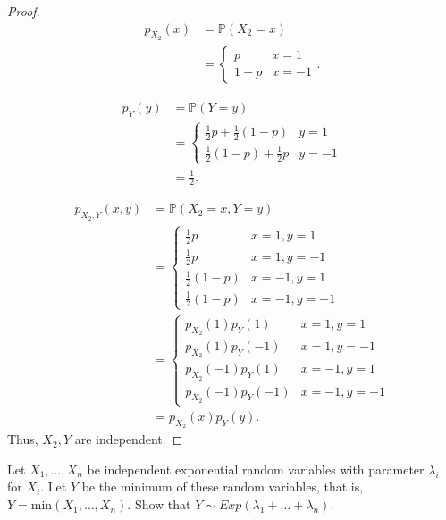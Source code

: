 \documentclass[addpoints, 11pt]{exam}
\newcommand*{\prob}{\mathds{P}}
\newenvironment{question}[1]{\smallskip\noindent\color{crimson}{\bf Question #1.}}{}
\begin{document}
\begin{proof}
    \begin{align}
        p_{X_2}(x) 
        &= \prob(X_2 = x) \\
        &= \begin{cases}
            p & x = 1 \\
            1 - p & x = -1
        \end{cases}.
    \end{align}

    \begin{align}
        p_{Y}(y) 
        &= \prob(Y = y) \\
        &= \begin{cases}
            \frac{1}{2}p + \frac{1}{2}(1 - p) & y = 1 \\
            \frac{1}{2}(1 - p) + \frac{1}{2}p & y = -1
        \end{cases} \\
        &= \frac{1}{2}.
    \end{align}

    \begin{align}
        p_{X_2, Y}(x, y)
        &= \prob(X_2 = x, Y = y) \\
        &= \begin{cases}
            \frac{1}{2}p & x = 1, y = 1 \\
            \frac{1}{2}p & x = 1, y = -1 \\
            \frac{1}{2}(1 - p) & x = -1, y = 1 \\
            \frac{1}{2}(1 - p) & x = -1, y = -1
        \end{cases} \\
        &= \begin{cases}
            p_{X_2}(1)p_{Y}(1) & x = 1, y = 1 \\
            p_{X_2}(1)p_{Y}(-1) & x = 1, y = -1 \\
            p_{X_2}(-1)p_{Y}(1) & x = -1, y = 1 \\
            p_{X_2}(-1)p_{Y}(-1) & x = -1, y = -1
        \end{cases} \\
        &= p_{X_2}(x)p_{Y}(y).
    \end{align}
    Thus, $X_2, Y$ are independent.
\end{proof}

\newpage
\begin{question}{5}
     Let $X_1, \dots , X_n$ be independent exponential random variables with parameter $\lambda_i$ for $X_i$. Let $Y$ be the minimum of these random variables, that is, $Y = \text{min}(X_1, \dots , X_n)$. Show that $Y \sim Exp(\lambda_1 + \dots + \lambda_n)$.
\end{question}
\end{document}
